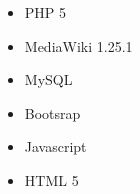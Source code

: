 
%

%

\begin{itemize}
	\item PHP 5
	\item MediaWiki 1.25.1
	\item MySQL
	\item Bootsrap
	\item Javascript
	\item HTML 5
\end{itemize}
